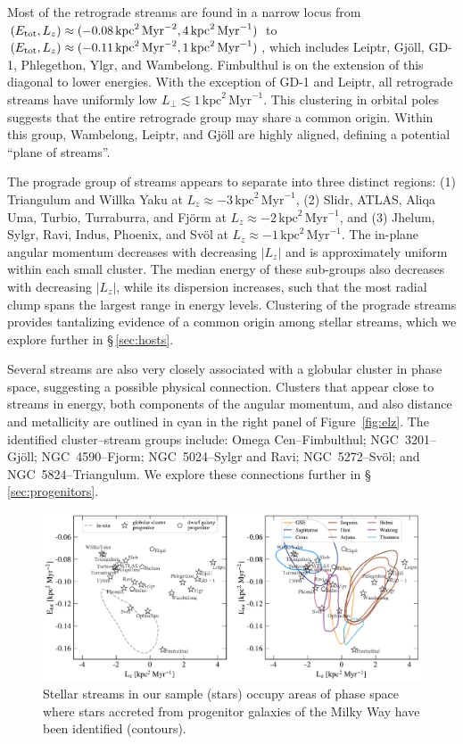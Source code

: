 \documentclass[twocolumn]{aastex63}
\newcommand{\ul}{\ensuremath{\textrm{kpc}^2\,\textrm{Myr}^{-1}}}
\newcommand{\ue}{\ensuremath{\textrm{kpc}^2\,\textrm{Myr}^{-2}}}
\begin{document}
Most of the retrograde streams are found in a narrow locus from $(E_{\rm tot}, L_z)\approx(-0.08\,\ue,\allowbreak 4\,\ul)$ to $(E_{\rm tot}, L_z)\approx(-0.11\,\ue,\allowbreak 1\,\ul)$, which includes Leiptr, Gj\" oll, GD-1, Phlegethon, Ylgr, and Wambelong.
Fimbulthul is on the extension of this diagonal to lower energies.
With the exception of GD-1 and Leiptr, all retrograde streams have uniformly low $L_\perp\lesssim1\,\ul$.
This clustering in orbital poles suggests that the entire retrograde group may share a common origin.
Within this group, Wambelong, Leiptr, and Gj\" oll are highly aligned, defining a potential ``plane of streams''.

The prograde group of streams appears to separate into three distinct regions: (1) Triangulum and Willka Yaku at $L_z\approx-3\,\ul$, (2) Slidr, ATLAS, Aliqa Uma, Turbio, Turraburra, and Fj\" orm at $L_z\approx-2\,\ul$, and (3) Jhelum, Sylgr, Ravi, Indus, Phoenix, and Sv\" ol at $L_z\approx-1\,\ul$.
The in-plane angular momentum decreases with decreasing $|L_z|$ and is approximately uniform within each small cluster.
The median energy of these sub-groups also decreases with decreasing $|L_z|$, while its dispersion increases, such that the most radial clump spans the largest range in energy levels.
Clustering of the prograde streams  provides tantalizing evidence of a common origin among stellar streams, which we explore further in \S\,\ref{sec:hosts}.

Several streams are also very closely associated with a globular cluster in phase space, suggesting a possible physical connection.
Clusters that appear close to streams in energy, both components of the angular momentum, and also distance and metallicity are outlined in cyan in the right panel of Figure~\ref{fig:elz}.
The identified cluster--stream groups include: Omega Cen--Fimbulthul; NGC~3201--Gj\" oll; NGC~4590--Fjorm; NGC~5024--Sylgr and Ravi; NGC~5272--Sv\" ol; and NGC~5824--Triangulum.
We explore these connections further in \S\,\ref{sec:progenitors}.

\begin{figure}
\begin{center}
\includegraphics[width=\textwidth]{stream_hosts.pdf}
\end{center}
\caption{
Stellar streams in our sample (stars) occupy areas of phase space where stars accreted from progenitor galaxies of the Milky Way have been identified (contours).
}
\label{fig:hosts}
\end{figure}
\end{document}
